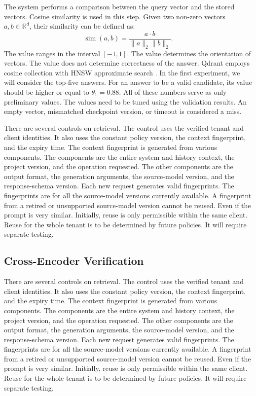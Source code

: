 \documentclass{FastFyp}
\begin{document}
The system performs a comparison between the query vector and the stored vectors.
Cosine similarity is used in this step.
Given two non-zero vectors $a,b\in\mathbb R^d$, their similarity can be defined as:
\begin{equation}
\operatorname{sim}(a,b)=\frac{a\cdot b}{\|a\|_2\|b\|_2}.
\label{eq:cosine}
\end{equation}
The value ranges in the interval $[-1,1]$.
The value determines the orientation of vectors.
The value does not determine correctness of the answer.
Qdrant employs cosine collection with HNSW approximate search \cite{ref:HNSW,ref:Qdrant}.
In the first experiment, we will consider the top-five answers.
For an answer to be a valid candidate, its value should be higher or equal to $\theta_1=0.88$.
All of these numbers serve as only preliminary values.
The values need to be tuned using the validation results.
An empty vector, mismatched checkpoint version, or timeout is considered a miss.

There are several controls on retrieval.
The control uses the verified tenant and client identities.
It also uses the constant policy version, the context fingerprint, and the expiry time.
The context fingerprint is generated from various components.
The components are the entire system and history context, the project version, and the operation requested.
The other components are the output format, the generation arguments, the source-model version, and the response-schema version.
Each new request generates valid fingerprints.
The fingerprints are for all the source-model versions currently available.
A fingerprint from a retired or unsupported source-model version cannot be reused.
Even if the prompt is very similar.
Initially, reuse is only permissible within the same client.
Reuse for the whole tenant is to be determined by future policies.
It will require separate testing.

\subsection{Cross-Encoder Verification}
There are several controls on retrieval.
The control uses the verified tenant and client identities.
It also uses the constant policy version, the context fingerprint, and the expiry time.
The context fingerprint is generated from various components.
The components are the entire system and history context, the project version, and the operation requested.
The other components are the output format, the generation arguments, the source-model version, and the response-schema version.
Each new request generates valid fingerprints.
The fingerprints are for all the source-model versions currently available.
A fingerprint from a retired or unsupported source-model version cannot be reused.
Even if the prompt is very similar.
Initially, reuse is only permissible within the same client.
Reuse for the whole tenant is to be determined by future policies.
It will require separate testing.
\end{document}
